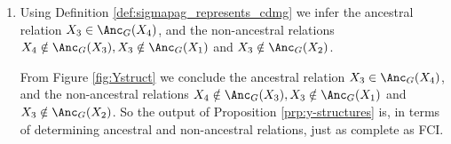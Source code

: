 \begin{enumerate}
\begin{ungradedsolution}
\begin{enumerate}
\begin{enumerate}[label=\arabic*)]
			\begin{center}
			\end{center}
			Then, rules $\Rcal2, \Rcal3, \Rcal4$ don't apply (check this!), so we continue.
			\item Rules $\Rcal8, \Rcal9, \Rcal10$ don't apply (check this!), so we continue.
			\item Output
			\begin{center}
			\end{center}
		\end{enumerate}
		\item Using Definition \ref*{def:sigmapag_represents_cdmg} we infer the ancestral relation $X_3 \in \Anc_G(X_4)$, and the non-ancestral relations $X_4 \notin \Anc_G(X_3), X_3 \notin \Anc_G(X_1)$ and $X_3 \notin \Anc_G(X_2)$.
		
		From Figure \ref*{fig:Ystruct} we conclude the ancestral relation $X_3\in\Anc_G(X_4)$, and the non-ancestral relations $X_4 \notin \Anc_G(X_3), X_3 \notin \Anc_G(X_1)$ and $X_3 \notin \Anc_G(X_2)$. So the output of Proposition \ref*{prp:y-structures} is, in terms of determining ancestral and non-ancestral relations, just as complete as FCI.
	\end{enumerate}
\end{ungradedsolution}
\end{enumerate}

